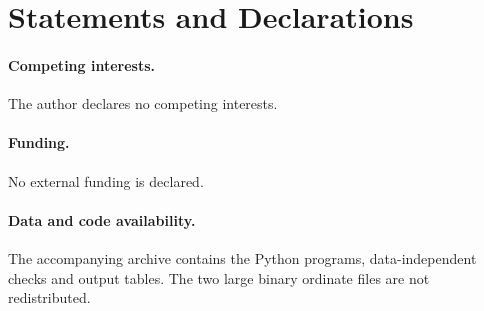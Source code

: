 \documentclass[11pt,reqno]{amsart}
\theoremstyle{plain}\newtheorem{theorem}{Theorem}[section]\newtheorem{proposition}[theorem]{Proposition}\newtheorem{lemma}[theorem]{Lemma}\newtheorem{corollary}[theorem]{Corollary}
\theoremstyle{definition}\newtheorem{hypothesis}[theorem]{Hypothesis}\newtheorem{definition}[theorem]{Definition}
\theoremstyle{remark}\newtheorem{remark}[theorem]{Remark}\newtheorem{experiment}[theorem]{Experiment}\newtheorem{question}[theorem]{Question}\newtheorem{heuristic}[theorem]{Heuristic}\newtheorem{conjecture}[theorem]{Conjecture}
\begin{document}
\section*{Statements and Declarations}
\paragraph{Competing interests.} The author declares no competing interests.
\paragraph{Funding.} No external funding is declared.
\paragraph{Data and code availability.} The accompanying archive contains the Python programs, data-independent checks and output tables. The two large binary ordinate files are not redistributed.
\end{document}
